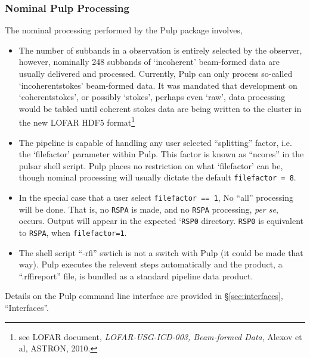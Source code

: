 \documentclass[a4paper,10pt,bibtotoc]{scrartcl}
\begin{document}
\subsubsection{Nominal Pulp Processing}
The nominal processing performed by the Pulp package involves,
\begin{itemize}
\item The number of subbands in a observation is entirely selected by the observer,
however, nominally 248 subbands of `incoherent' beam-formed data are
usually delivered and processed.  Currently, Pulp can only process
so-called  `incoherentstokes' beam-formed data.  It was mandated that
development on `coherentstokes', or possibly `stokes', perhaps even
`raw', data processing would be tabled until coherent stokes data are
being written to the cluster in the new LOFAR HDF5
format\footnote{see LOFAR document, \textit{LOFAR-USG-ICD-003,
    Beam-formed Data}, Alexov et al, ASTRON, 2010.}
\item The pipeline is capable of handling any user selected ``splitting'' factor, i.e. the 
`filefactor' parameter within Pulp.  This factor is known as ``ncores'' in the pulsar
shell script.  Pulp places no restriction on what `filefactor' can be, though nominal
processing will usually dictate the default \verb|filefactor = 8|.
\item In the special case that a user select \verb|filefactor == 1|,
  No ``all'' processing will be done.  That is, no \verb|RSPA| is
  made, and no \verb|RSPA| processing, \emph{per se}, occurs.  Output will appear in the
  expected `\verb|RSP0| directory. \verb|RSP0| is equivalent to
  \verb|RSPA|, when \verb|filefactor=1|.
\item The shell script ``-rfi'' swtich is not a switch with Pulp (it
  could be made that way).  Pulp executes the relevent steps
  automatically and the product, a ``.rffireport'' file, is bundled as
  a standard pipeline data product.
\end{itemize}
Details on the Pulp command line interface are provided in
\S\ref{sec:interfaces}, ``Interfaces''.
\end{document}
